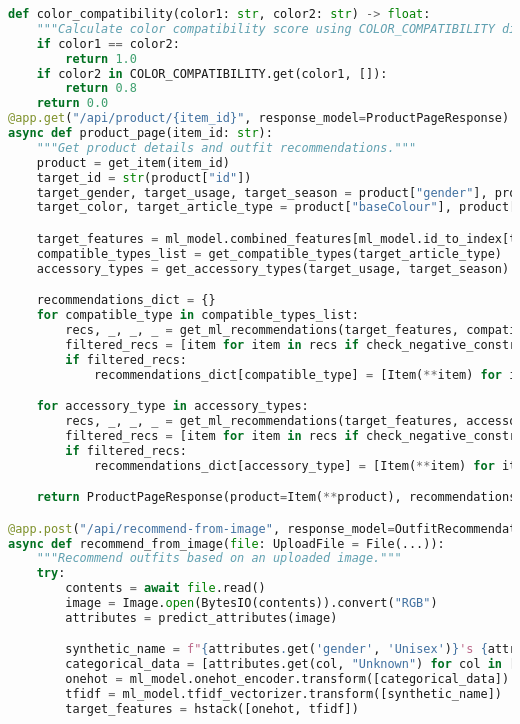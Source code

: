 \documentclass[12pt,a4paper]{article}
\begin{document}
\begin{lstlisting}[language=Python]
def color_compatibility(color1: str, color2: str) -> float:
    """Calculate color compatibility score using COLOR_COMPATIBILITY dictionary."""
    if color1 == color2:
        return 1.0
    if color2 in COLOR_COMPATIBILITY.get(color1, []):
        return 0.8
    return 0.0
@app.get("/api/product/{item_id}", response_model=ProductPageResponse)
async def product_page(item_id: str):
    """Get product details and outfit recommendations."""
    product = get_item(item_id)
    target_id = str(product["id"])
    target_gender, target_usage, target_season = product["gender"], product["usage"], product["season"]
    target_color, target_article_type = product["baseColour"], product["articleType"]

    target_features = ml_model.combined_features[ml_model.id_to_index[target_id]]
    compatible_types_list = get_compatible_types(target_article_type)
    accessory_types = get_accessory_types(target_usage, target_season)

    recommendations_dict = {}
    for compatible_type in compatible_types_list:
        recs, _, _, _ = get_ml_recommendations(target_features, compatible_type, target_gender, target_color, target_id)
        filtered_recs = [item for item in recs if check_negative_constraints(product, item)]
        if filtered_recs:
            recommendations_dict[compatible_type] = [Item(**item) for item in filtered_recs[:3]]

    for accessory_type in accessory_types:
        recs, _, _, _ = get_ml_recommendations(target_features, accessory_type, target_gender, target_color, target_id)
        filtered_recs = [item for item in recs if check_negative_constraints(product, item)]
        if filtered_recs:
            recommendations_dict[accessory_type] = [Item(**item) for item in filtered_recs[:3]]

    return ProductPageResponse(product=Item(**product), recommendations=OutfitRecommendation(recommendations=recommendations_dict))

@app.post("/api/recommend-from-image", response_model=OutfitRecommendation)
async def recommend_from_image(file: UploadFile = File(...)):
    """Recommend outfits based on an uploaded image."""
    try:
        contents = await file.read()
        image = Image.open(BytesIO(contents)).convert("RGB")
        attributes = predict_attributes(image)

        synthetic_name = f"{attributes.get('gender', 'Unisex')}'s {attributes.get('baseColour', '')} {attributes.get('articleType', 'Fashion Item')}"
        categorical_data = [attributes.get(col, "Unknown") for col in ["gender", "masterCategory", "subCategory", "articleType", "baseColour", "season", "usage"]]
        onehot = ml_model.onehot_encoder.transform([categorical_data])
        tfidf = ml_model.tfidf_vectorizer.transform([synthetic_name])
        target_features = hstack([onehot, tfidf])


\end{lstlisting}
\end{document}

